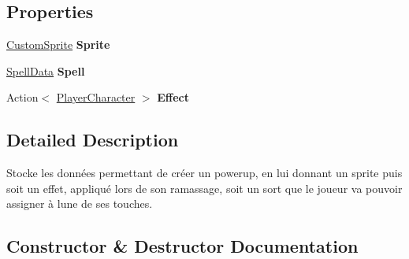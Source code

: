 \subsection*{Properties}
\begin{DoxyCompactItemize}
\item 
\mbox{\label{class_tentacle_slicers_1_1actors_1_1_powerup_data_a593924ed3ea021f324ab6f89646f995b}} 
\hyperlink{class_tentacle_slicers_1_1graphics_1_1_custom_sprite}{Custom\+Sprite} {\bfseries Sprite}
\item 
\mbox{\label{class_tentacle_slicers_1_1actors_1_1_powerup_data_a52a76991005d1ff32f3ba06e77f26006}} 
\hyperlink{class_tentacle_slicers_1_1spells_1_1_spell_data}{Spell\+Data} {\bfseries Spell}
\item 
\mbox{\label{class_tentacle_slicers_1_1actors_1_1_powerup_data_a62e3b054237f542ba97d7e66ecdd2961}} 
Action$<$ \hyperlink{class_tentacle_slicers_1_1actors_1_1_player_character}{Player\+Character} $>$ {\bfseries Effect}
\end{DoxyCompactItemize}


\subsection{Detailed Description}
Stocke les données permettant de créer un powerup, en lui donnant un sprite puis soit un effet, appliqué lors de son ramassage, soit un sort que le joueur va pouvoir assigner à l\textquotesingle{}une de ses touches. 



\subsection{Constructor \& Destructor Documentation}
\mbox{\label{class_tentacle_slicers_1_1actors_1_1_powerup_data_a9a5c4ceb7a6fc39f8de165d397c63d81}} 
